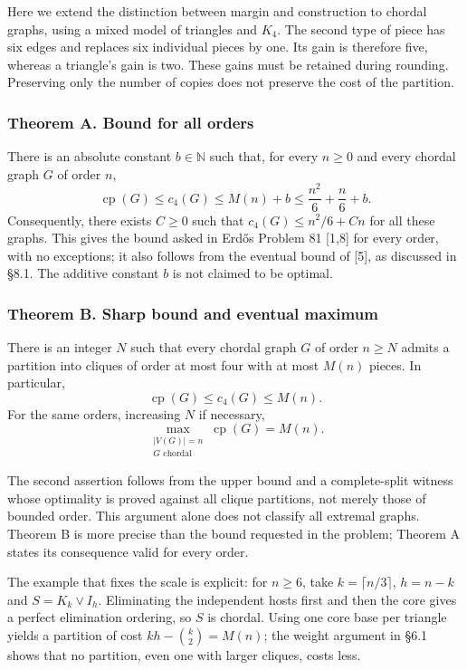 \documentclass[english,11pt,a4paper]{article}
\begin{document}
Here we extend the distinction between margin and construction to chordal graphs, using a mixed model of triangles and \(K_4\). The second type of piece has six edges and replaces six individual pieces by one. Its gain is therefore five, whereas a triangle's gain is two. These gains must be retained during rounding. Preserving only the number of copies does not preserve the cost of the partition.

\subsubsection{Theorem A. Bound for all orders}\label{theorem-a.-bound-for-all-orders}

There is an absolute constant \(b\in\mathbb N\) such that, for every \(n\ge0\) and every chordal graph \(G\) of order \(n\), \[
\operatorname{cp}(G)\le c_4(G)\le M(n)+b
\le\frac{n^2}{6}+\frac n6+b.
\tag{A}
\] Consequently, there exists \(C\ge0\) such that \(c_4(G)\le n^2/6+Cn\) for all these graphs. This gives the bound asked in Erdős Problem 81 {[}1,8{]} for every order, with no exceptions; it also follows from the eventual bound of {[}5{]}, as discussed in §8.1. The additive constant \(b\) is not claimed to be optimal.

\subsubsection{Theorem B. Sharp bound and eventual maximum}\label{theorem-b.-sharp-bound-and-eventual-maximum}

There is an integer \(N\) such that every chordal graph \(G\) of order \(n\ge N\) admits a partition into cliques of order at most four with at most \(M(n)\) pieces. In particular, \[
\operatorname{cp}(G)\le c_4(G)\le M(n).
\tag{1.1}
\] For the same orders, increasing \(N\) if necessary, \[
\max_{\substack{|V(G)|=n\\G\text{ chordal}}}\operatorname{cp}(G)=M(n).
\tag{1.2}
\]

The second assertion follows from the upper bound and a complete-split witness whose optimality is proved against all clique partitions, not merely those of bounded order. This argument alone does not classify all extremal graphs. Theorem B is more precise than the bound requested in the problem; Theorem A states its consequence valid for every order.

The example that fixes the scale is explicit: for \(n\ge6\), take \(k=\lceil n/3\rceil\), \(h=n-k\) and \(S=K_k\vee I_h\). Eliminating the independent hosts first and then the core gives a perfect elimination ordering, so \(S\) is chordal. Using one core base per triangle yields a partition of cost \(kh-\binom k2=M(n)\); the weight argument in §6.1 shows that no partition, even one with larger cliques, costs less.
\end{document}
